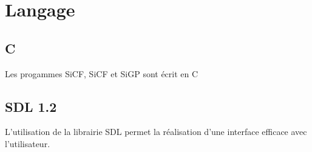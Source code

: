 %
\section{Langage}
%
%
\subsection{C}
%
Les progammes SiCF, SiCF et SiGP sont écrit en C \cite{guide-C} \cite{langage-C}
%
\subsection{SDL 1.2}
%
L'utilisation de la librairie SDL permet la réalisation d'une interface efficace avec l'utilisateur.
%
%
